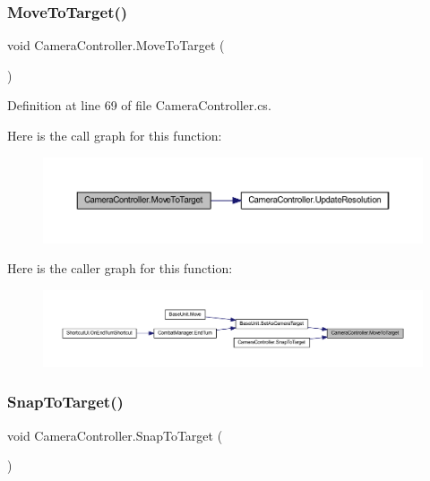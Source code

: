 \subsubsection{\texorpdfstring{MoveToTarget()}{MoveToTarget()}}
{\footnotesize\ttfamily void Camera\+Controller.\+Move\+To\+Target (\begin{DoxyParamCaption}{ }\end{DoxyParamCaption})}



Definition at line 69 of file Camera\+Controller.\+cs.

Here is the call graph for this function\+:
\nopagebreak
\begin{figure}[H]
\begin{center}
\leavevmode
\includegraphics[width=350pt]{class_camera_controller_a79831008bb764801df46a3c91343a524_cgraph}
\end{center}
\end{figure}
Here is the caller graph for this function\+:
\nopagebreak
\begin{figure}[H]
\begin{center}
\leavevmode
\includegraphics[width=350pt]{class_camera_controller_a79831008bb764801df46a3c91343a524_icgraph}
\end{center}
\end{figure}
\mbox{\label{class_camera_controller_a9e2d7df7c696c1c2ce48384933c5d1ab}} 
\subsubsection{\texorpdfstring{SnapToTarget()}{SnapToTarget()}}
{\footnotesize\ttfamily void Camera\+Controller.\+Snap\+To\+Target (\begin{DoxyParamCaption}{ }\end{DoxyParamCaption})}



